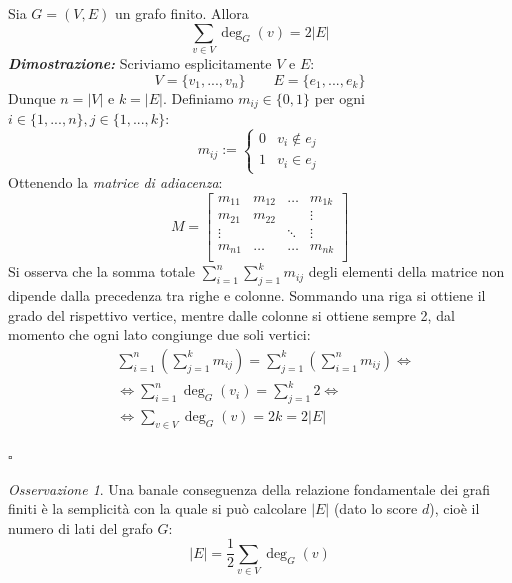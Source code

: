 \documentclass[oneside]{book}
\theoremstyle{remark}
\newtheorem*{osservaz}{Osservazione}
\newcommand{\cvd}{\begin{flushright}$\square$\end{flushright}} %
\begin{document}
\begin{tcolorbox}[title={Relazione fondamentale dei grafi finiti}]
Sia $G=(V,E)$ un grafo finito. Allora
\[ \sum_{v\in V} \deg_G(v) = 2|E| \]
\textit{\textbf{Dimostrazione:}} Scriviamo esplicitamente $V$ e $E$:
\[ V=\{v_1,...,v_n\} \qquad E=\{e_1,...,e_k\} \]
Dunque $n=|V|$ e $k=|E|$. Definiamo $m_{ij} \in \{0,1\}$ per ogni
$i \in \{1,...,n\}, j \in \{1,...,k\}$:
\[
    m_{ij} :=
    \begin{cases}
        0 & v_i \not \in e_j\\
        1 & v_i \in e_j
    \end{cases}
\]
Ottenendo la \textit{matrice di adiacenza}:
\[ 
    M =
    \begin{bmatrix}
        m_{11} & m_{12} & \dots  & m_{1k}\\
        m_{21} & m_{22} &        & \vdots\\
        \vdots &        & \ddots & \vdots\\
        m_{n1} & \dots  & \dots  & m_{nk}\\
    \end{bmatrix}
\]
Si osserva che la somma totale $\sum_{i=1}^{n}\sum_{j=1}^{k}m_{ij}$ degli elementi
della matrice non dipende dalla precedenza tra righe e colonne. Sommando
una riga si ottiene il grado del rispettivo vertice, mentre dalle
colonne si ottiene sempre 2, dal momento che ogni lato congiunge due
soli vertici:
\begin{align*}
    &\sum_{i=1}^{n}\left(\sum_{j=1}^{k}m_{ij}\right) = \sum_{j=1}^{k}\left(\sum_{i=1}^{n}m_{ij}\right)\Leftrightarrow\\
    &\Leftrightarrow \sum_{i=1}^{n}\deg_G(v_i) = \sum_{j=1}^{k}2\Leftrightarrow\\
    &\Leftrightarrow \sum_{v\in V}\deg_G(v)=2k=2|E|
\end{align*}
\cvd
\end{tcolorbox}

\begin{osservaz}
Una banale conseguenza della relazione fondamentale dei grafi finiti è
la semplicità con la quale si può calcolare $|E|$ (dato lo score $d$), cioè
il numero di lati del grafo $G$:
\[ |E| = \frac{1}{2}\sum_{v\in V}\deg_G(v) \]
\end{osservaz}
\end{document}
